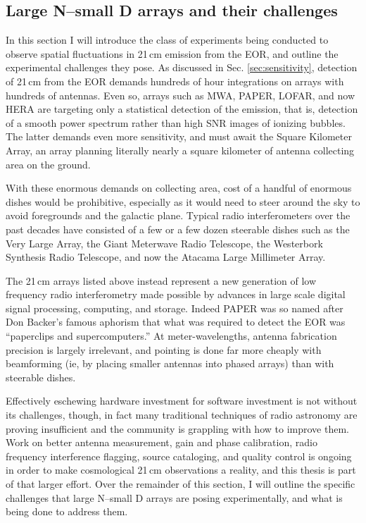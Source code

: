 \subsection{Large N--small D arrays and their challenges}

In this section I will introduce the class of experiments being conducted to observe spatial fluctuations in 21\,cm emission from the EOR, and outline the experimental challenges they pose. As discussed in Sec. \ref{sec:sensitivity}, detection of 21\,cm from the EOR demands hundreds of hour integrations on arrays with hundreds of antennas. Even so, arrays such as MWA, PAPER, LOFAR, and now HERA are targeting only a statistical detection of the emission, that is, detection of a smooth power spectrum rather than high SNR images of ionizing bubbles. The latter demands even more sensitivity, and must await the Square Kilometer Array, an array planning literally nearly a square kilometer of antenna collecting area on the ground. 

With these enormous demands on collecting area, cost of a handful of enormous dishes would be prohibitive, especially as it would need to steer around the sky to avoid foregrounds and the galactic plane. Typical radio interferometers over the past decades have consisted of a few or a few dozen steerable dishes such as the Very Large Array, the Giant Meterwave Radio Telescope, the Westerbork Synthesis Radio Telescope, and now the Atacama Large Millimeter Array. 

The 21\,cm arrays listed above instead represent a new generation of low frequency radio interferometry made possible by advances in large scale digital signal processing, computing, and storage. Indeed PAPER was so named after Don Backer's famous aphorism that what was required to detect the EOR was ``paperclips and supercomputers.'' At meter-wavelengths, antenna fabrication precision is largely irrelevant, and pointing is done far more cheaply with beamforming (ie, by placing smaller antennas into phased arrays) than with steerable dishes. 

Effectively eschewing hardware investment for software investment is not without its challenges, though, in fact many traditional techniques of radio astronomy are proving insufficient and the community is grappling with how to improve them. Work on better antenna measurement, gain and phase calibration, radio frequency interference flagging, source cataloging, and quality control is ongoing in order to make cosmological 21\,cm observations a reality, and this thesis is part of that larger effort. Over the remainder of this section, I will outline the specific challenges that large N--small D arrays are posing experimentally, and what is being done to address them.

